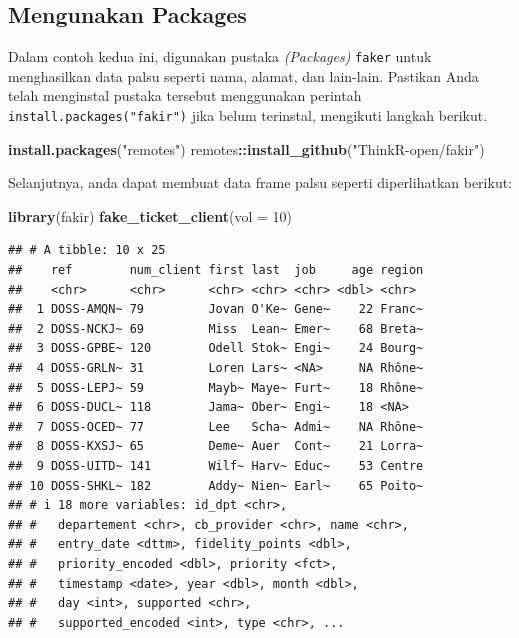 \documentclass[
]{book}
\newenvironment{Shaded}{\begin{snugshade}}{\end{snugshade}}
\newcommand{\AttributeTok}[1]{\textcolor[rgb]{0.13,0.29,0.53}{#1}}
\newcommand{\DecValTok}[1]{\textcolor[rgb]{0.00,0.00,0.81}{#1}}
\newcommand{\FunctionTok}[1]{\textcolor[rgb]{0.13,0.29,0.53}{\textbf{#1}}}
\newcommand{\NormalTok}[1]{#1}
\newcommand{\SpecialCharTok}[1]{\textcolor[rgb]{0.81,0.36,0.00}{\textbf{#1}}}
\newcommand{\StringTok}[1]{\textcolor[rgb]{0.31,0.60,0.02}{#1}}
\begin{document}
\hypertarget{mengunakan-packages}{%
\subsection{Mengunakan Packages}\label{mengunakan-packages}}

Dalam contoh kedua ini, digunakan pustaka \emph{(Packages)} \texttt{faker} untuk menghasilkan data palsu seperti nama, alamat, dan lain-lain. Pastikan Anda telah menginstal pustaka tersebut menggunakan perintah \texttt{install.packages("fakir")} jika belum terinstal, mengikuti langkah berikut.

\begin{Shaded}
\begin{Highlighting}[]
\FunctionTok{install.packages}\NormalTok{(}\StringTok{"remotes"}\NormalTok{)}
\NormalTok{remotes}\SpecialCharTok{::}\FunctionTok{install\_github}\NormalTok{(}\StringTok{"ThinkR{-}open/fakir"}\NormalTok{)}
\end{Highlighting}
\end{Shaded}

Selanjutnya, anda dapat membuat data frame palsu seperti diperlihatkan berikut:

\begin{Shaded}
\begin{Highlighting}[]
\FunctionTok{library}\NormalTok{(fakir)}
\FunctionTok{fake\_ticket\_client}\NormalTok{(}\AttributeTok{vol =} \DecValTok{10}\NormalTok{)}
\end{Highlighting}
\end{Shaded}

\begin{verbatim}
## # A tibble: 10 x 25
##    ref        num_client first last  job     age region
##    <chr>      <chr>      <chr> <chr> <chr> <dbl> <chr> 
##  1 DOSS-AMQN~ 79         Jovan O'Ke~ Gene~    22 Franc~
##  2 DOSS-NCKJ~ 69         Miss  Lean~ Emer~    68 Breta~
##  3 DOSS-GPBE~ 120        Odell Stok~ Engi~    24 Bourg~
##  4 DOSS-GRLN~ 31         Loren Lars~ <NA>     NA Rhône~
##  5 DOSS-LEPJ~ 59         Mayb~ Maye~ Furt~    18 Rhône~
##  6 DOSS-DUCL~ 118        Jama~ Ober~ Engi~    18 <NA>  
##  7 DOSS-OCED~ 77         Lee   Scha~ Admi~    NA Rhône~
##  8 DOSS-KXSJ~ 65         Deme~ Auer  Cont~    21 Lorra~
##  9 DOSS-UITD~ 141        Wilf~ Harv~ Educ~    53 Centre
## 10 DOSS-SHKL~ 182        Addy~ Nien~ Earl~    65 Poito~
## # i 18 more variables: id_dpt <chr>,
## #   departement <chr>, cb_provider <chr>, name <chr>,
## #   entry_date <dttm>, fidelity_points <dbl>,
## #   priority_encoded <dbl>, priority <fct>,
## #   timestamp <date>, year <dbl>, month <dbl>,
## #   day <int>, supported <chr>,
## #   supported_encoded <int>, type <chr>, ...
\end{verbatim}
\end{document}
